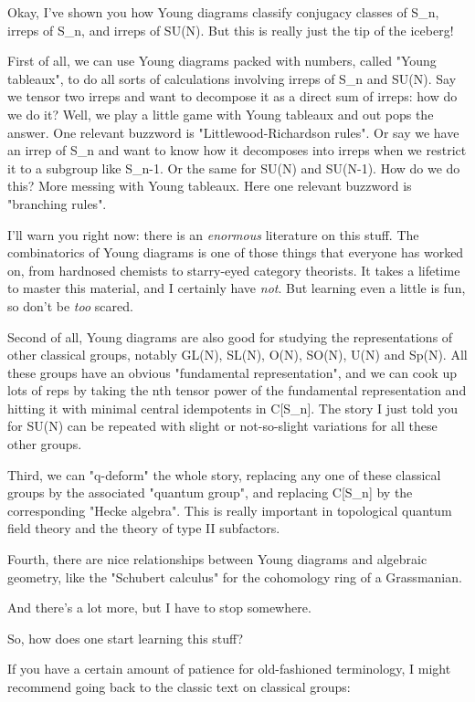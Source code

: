 Okay, I've shown you how Young diagrams classify conjugacy classes of
S_{n}, irreps of S_{n}, and irreps of SU(N).  But this is really just the
tip of the iceberg!

First of all, we can use Young diagrams packed with numbers, called
"Young tableaux", to do all sorts of calculations involving
irreps of S_{n} and SU(N).  Say we tensor two irreps and want to
decompose it as a direct sum of irreps: how do we do it?  Well, we play
a little game with Young tableaux and out pops the answer.  One relevant
buzzword is "Littlewood-Richardson rules".  Or say we have an
irrep of S_{n} and want to know how it decomposes into irreps
when we restrict it to a subgroup like S_{n-1}.  Or the same for
SU(N) and SU(N-1).  How do we do this?  More messing with Young
tableaux.  Here one relevant buzzword is "branching rules".

I'll warn you right now: there is an \emph{enormous} literature on this
stuff.  The combinatorics of Young diagrams is one of those things that
everyone has worked on, from hardnosed chemists to starry-eyed category
theorists.  It takes a lifetime to master this material, and I certainly
have \emph{not}.  But learning even a little is fun, so don't 
be \emph{too} scared.

Second of all, Young diagrams are also good for studying the
representations of other classical groups, notably GL(N), SL(N), O(N),
SO(N), U(N) and Sp(N).  All these groups have an obvious "fundamental
representation", and we can cook up lots of reps by taking the nth
tensor power of the fundamental representation and hitting it with
minimal central idempotents in C[S_{n}].  The story I just told you for
SU(N) can be repeated with slight or not-so-slight variations for all
these other groups.

Third, we can "q-deform" the whole story, replacing any one of
these classical groups by the associated "quantum group", and
replacing C[S_{n}] by the corresponding "Hecke
algebra".  This is really important in topological quantum field
theory and the theory of type II subfactors.

Fourth, there are nice relationships between Young diagrams and 
algebraic geometry, like the "Schubert calculus" for the cohomology 
ring of a Grassmanian.

And there's a lot more, but I have to stop somewhere.

So, how does one start learning this stuff?

If you have a certain amount of patience for old-fashioned terminology,
I might recommend going back to the classic text on classical groups:

